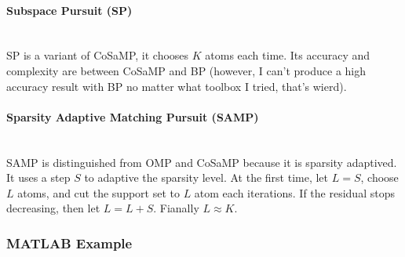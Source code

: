 \documentclass[12pt]{ctexart}
\begin{document}
\paragraph{\textbf{Subspace Pursuit (SP)}}\mbox{}\\
SP is a variant of CoSaMP, it chooses $K$ atoms each time. Its accuracy and complexity
are between CoSaMP and BP (however, I can't produce a high accuracy result with BP no
matter what toolbox I tried, that's wierd).

\paragraph{\textbf{Sparsity Adaptive Matching Pursuit (SAMP)}}\mbox{}\\
SAMP is distinguished from OMP and CoSaMP because it is sparsity adaptived. It
uses a step $S$ to adaptive the sparsity level. At the first time, let $L = S$,
choose $L$ atoms, and cut the support set to $L$ atom each iterations. If the
residual stops decreasing, then let $L = L + S$. Fianally $L \approx K$.

\subsubsection{\textbf{MATLAB Example}}
\end{document}
